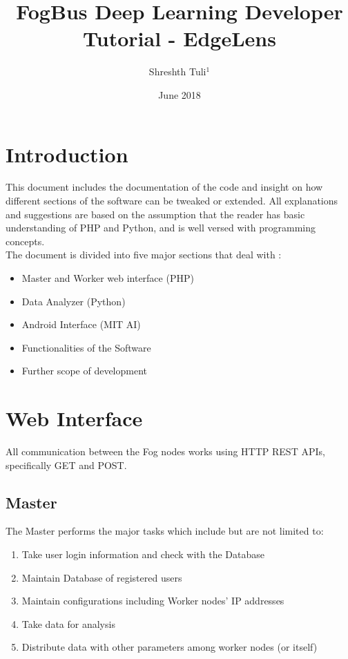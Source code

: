 \documentclass{article}
\title{FogBus Deep Learning Developer Tutorial - EdgeLens}
\author{Shreshth Tuli$^{1}$}
\date{June 2018}
\begin{document}
\maketitle

\section{Introduction}
This document includes the documentation of the code and insight on how different sections of the software can be tweaked or extended. All explanations and suggestions are based on the assumption that the reader has basic understanding of PHP and Python, and is well versed with programming concepts. \\
The document is divided into five major sections that deal with : 
\begin{itemize}
\item Master and Worker web interface (PHP)
\item Data Analyzer (Python)
\item Android Interface (MIT AI)
\item Functionalities of the Software
\item Further scope of development
\end{itemize}

\section{Web Interface}
All communication between the Fog nodes works using HTTP REST APIs, specifically GET and POST. 
\subsection{Master}
The Master performs the major tasks which include but are not limited to:
\begin{enumerate}
\item Take user login information and check with the Database
\item Maintain Database of registered users
\item Maintain configurations including Worker nodes' IP addresses
\item Take data for analysis
\item Distribute data with other parameters among worker nodes (or itself)
\end{enumerate}
\end{document}
